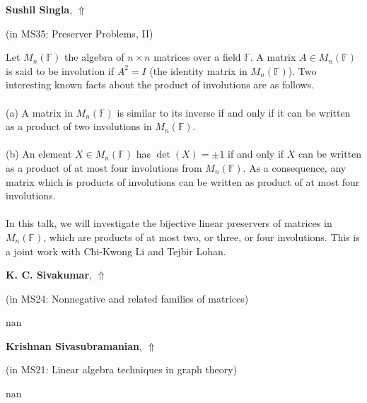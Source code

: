 \documentclass[ILAS2025-program.tex]{subfiles}
\begin{document}
     \hypertarget{down0282}{}\begin{ilasabstract}
    
    \textbf{Sushil Singla},  \hfill \hyperlink{up0282}{$\Uparrow$}
    
    (in {\color{mstitle}MS35: Preserver Problems, II})
        
        \mtskip
    Let $M_n(\mathbb F)$ the algebra of $n \times n$ matrices over a field  $\mathbb F$.  A matrix $A\in M_n(\mathbb F)$ is said to be involution if $A^2=I$ (the identity matrix in $M_n(\mathbb F)$). Two interesting known facts about the product of involutions are as follows.\\ \\
 (a) A matrix in $  M_n(\mathbb F)$ is similar to its inverse if and only if it can be written as a product of two involutions in $M_n(\mathbb F)$.\\ \\
 (b) An element $X \in M_n(\mathbb F)$ has $\det(X) =\pm 1$ if and only if $X$ can be written as a product of at most four involutions from $M_n(\mathbb F)$. As a consequence, any matrix which is products of involutions can be written as product of at most four involutions.\\ \\
In this talk, we will investigate the bijective linear preservers of matrices in $M_n(\mathbb F)$, which are products of at most two, or three, or four involutions. This is a joint work with Chi-Kwong Li and Tejbir Lohan.

\end{ilasabstract}
     \hypertarget{down0353}{}\begin{ilasabstract}
    
    \textbf{K. C. Sivakumar},  \hfill \hyperlink{up0353}{$\Uparrow$}
    
    (in {\color{mstitle}MS24: Nonnegative and related families of matrices})
        
        \mtskip
    nan\end{ilasabstract}
     \hypertarget{down0337}{}\begin{ilasabstract}
    
    \textbf{Krishnan Sivasubramanian},  \hfill \hyperlink{up0337}{$\Uparrow$}
    
    (in {\color{mstitle}MS21: Linear algebra techniques in graph theory})
        
        \mtskip
    nan\end{ilasabstract}
\end{document}
